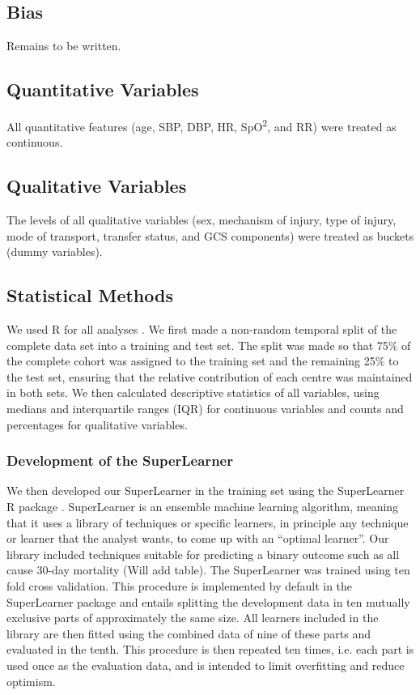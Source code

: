 \documentclass[10pt,letterpaper]{article}\usepackage[]{graphicx}\usepackage[]{color}
\begin{document}
\subsection*{Bias}
Remains to be written.

\subsection*{Quantitative Variables}
All quantitative features (age, SBP, DBP, HR, SpO\textsuperscript{2}, and RR) were
treated as continuous.

\subsection*{Qualitative Variables}
The levels of all qualitative variables (sex, mechanism of injury, type of
injury, mode of transport, transfer status, and GCS components) were treated as
buckets (dummy variables).

\subsection*{Statistical Methods}
We used R for all analyses \cite{R}. We first made a non-random temporal split
of the complete data set into a training and test set. The split was made so
that 75\% of the complete cohort was assigned to the training set and the
remaining 25\% to the test set, ensuring that the relative contribution of each
centre was maintained in both sets. We then calculated descriptive statistics of
all variables, using medians and interquartile ranges (IQR) for continuous
variables and counts and percentages for qualitative variables.

\subsubsection*{Development of the SuperLearner}
We then developed our SuperLearner in the training set using the SuperLearner R
package \cite{SuperLearner}. SuperLearner is an ensemble machine learning
algorithm, meaning that it uses a library of techniques or specific learners, in
principle any technique or learner that the analyst wants, to come up with an
``optimal learner''. Our library included techniques suitable for predicting a
binary outcome such as all cause 30-day mortality (Will add table). The
SuperLearner was trained using ten fold cross validation. This procedure is
implemented by default in the SuperLearner package and entails splitting the
development data in ten mutually exclusive parts of approximately the same
size. All learners included in the library are then fitted using the combined
data of nine of these parts and evaluated in the tenth. This procedure is then
repeated ten times, i.e. each part is used once as the evaluation data, and is
intended to limit overfitting and reduce optimism.
\end{document}
